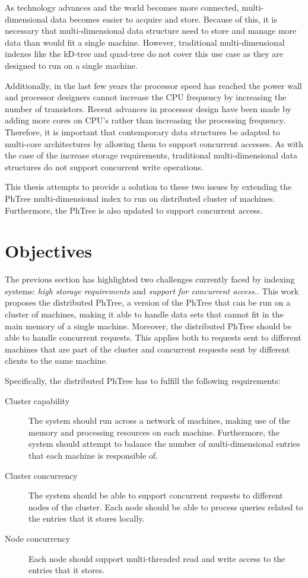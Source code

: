 \documentclass[11pt,a4paper]{globis-book}
\begin{document}
As technology advances and the world becomes more connected, multi-dimensional data becomes easier to acquire and store. Because of this, it is necessary that multi-dimensional data structure need to store and manage more data than would fit a single machine. However, traditional multi-dimensional indexes like the kD-tree and quad-tree do not cover this use case as they are designed to run on a single machine.

Additionally, in the last few years the processor speed has reached the power wall and processor designers cannot increase the CPU frequency by increasing the number of transistors. Recent advances in processor design have been made by adding more cores on CPU's rather than increasing the processing frequency. Therefore, it is important that contemporary data structures be adapted to multi-core architectures by allowing them to support concurrent accesses. As with the case of the increase storage requirements, traditional multi-dimensional data structures do not support concurrent write operations.

This thesis attempts to provide a solution to these two issues by extending the PhTree multi-dimensional index to run on distributed cluster of machines. Furthermore, the PhTree is also updated to support concurrent access.

\section{Objectives}
\label{sec:intro-objectives}
The previous section has highlighted two challenges currently faced by indexing systems: \textit{high storage requirements} and \textit{support for concurrent access.}. This work proposes the distributed PhTree, a version of the PhTree that can be run on a cluster of machines, making it able to handle data sets that cannot fit in the main memory of a single machine. Moreover, the distributed PhTree should be able to handle concurrent requests. This applies both to requests sent to different machines that are part of the cluster and concurrent requests sent by different clients to the same machine. 

Specifically, the distributed PhTree has to fulfill the following requirements:
\begin{description}
    \item[Cluster capability] The system should run across a network of machines, making use of the memory and processing resources on each machine. Furthermore, the system should attempt to balance the number of multi-dimensional entries that each machine is responsible of.
    \item[Cluster concurrency] The system should be able to support concurrent requests to different nodes of the cluster. Each node should be able to process queries related to the entries that it stores locally.
    \item[Node concurrency] Each node should support multi-threaded read and write access to the entries that it stores.
\end{description} 
\end{document}
